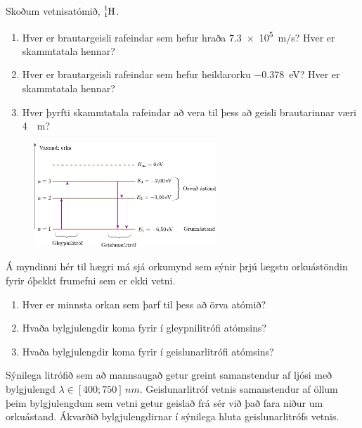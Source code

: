 \ifdefined \wholebook \else\documentclass[oneside]{book}\usepackage{EdlBook}\graphicspath{{figures/}}
\begin{document}
\begin{enumerate}[label = \textbf{(\alph*)}]



\item[\textbf{(38.31)}] Skoðum vetnisatómið, $\ce{^{1}_{1}H}$.
\begin{enumerate}[label = \textbf{(\alph*)}]
    \item Hver er brautargeisli rafeindar sem hefur hraða \SI{7.3e5}{m/s}? Hver er skammtatala hennar?
    \item Hver er brautargeisli rafeindar sem hefur heildarorku \SI{-0.378}{eV}? Hver er skammtatala hennar?
    \item Hver þyrfti skammtatala rafeindar að vera til þess að geisli brautarinnar væri \SI{4}{\mu m}?
\end{enumerate}

\begin{minipage}{\linewidth}
\begin{figure}
\vspace{-0.5cm}
\includegraphics[width = 2.7in]{figures/gleipni.pdf}
\end{figure}

\item[\textbf{(38.56)}] Á myndinni hér til hægri má sjá orkumynd sem sýnir þrjú lægstu orkuástöndin fyrir óþekkt frumefni sem er ekki vetni.
\begin{enumerate}[label = \textbf{(\alph*)}]
    \item Hver er minnsta orkan sem þarf til þess að örva atómið?
    \item Hvaða bylgjulengdir koma fyrir í gleypnilitrófi atómsins?
    \item Hvaða bylgjulengdir koma fyrir í geislunarlitrófi atómsins?
\end{enumerate}

\end{minipage}

\vspace{1cm}

\item[\textbf{(38.59)}] Sýnilega litrófið sem að mannsaugað getur greint samanstendur af ljósi með bylgjulengd $\lambda \in [400; 750] \, \si{nm}$. Geislunarlitróf vetnis samanstendur af öllum þeim bylgjulengdum sem vetni getur geislað frá sér við það fara niður um orkuástand. Ákvarðið bylgjulengdirnar í sýnilega hluta geislunarlitrófs vetnis.



\end{enumerate}
\end{document}
